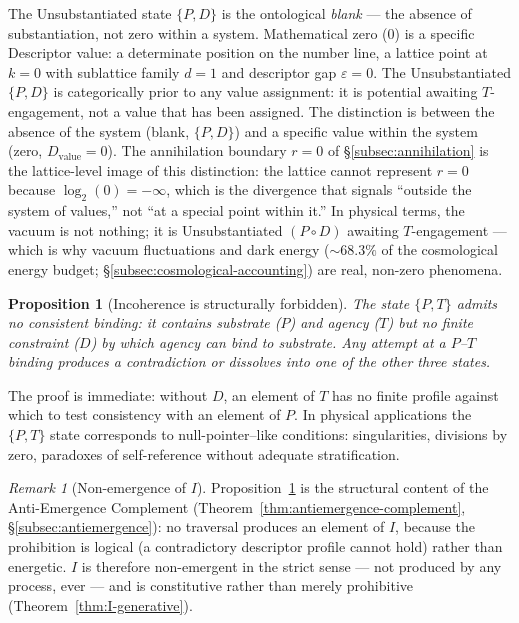 \documentclass[11pt,a4paper]{article}
\newtheorem{proposition}[theorem]{Proposition}
\theoremstyle{definition}
\theoremstyle{remark}
\newtheorem{remark}[theorem]{Remark}
\begin{document}
The Unsubstantiated state $\{P,D\}$ is the ontological \emph{blank} --- the absence of substantiation, not zero within a system. Mathematical zero ($0$) is a specific Descriptor value: a determinate position on the number line, a lattice point at $k = 0$ with sublattice family $d = 1$ and descriptor gap $\varepsilon = 0$. The Unsubstantiated $\{P,D\}$ is categorically prior to any value assignment: it is potential awaiting $T$-engagement, not a value that has been assigned. The distinction is between the absence of the system (blank, $\{P,D\}$) and a specific value within the system (zero, $D_{\mathrm{value}} = 0$). The annihilation boundary $r = 0$ of \S\ref{subsec:annihilation} is the lattice-level image of this distinction: the lattice cannot represent $r = 0$ because $\log_{2}(0) = -\infty$, which is the divergence that signals ``outside the system of values,'' not ``at a special point within it.'' In physical terms, the vacuum is not nothing; it is Unsubstantiated $(P \circ D)$ awaiting $T$-engagement --- which is why vacuum fluctuations and dark energy ($\sim 68.3\%$ of the cosmological energy budget; \S\ref{subsec:cosmological-accounting}) are real, non-zero phenomena.

\begin{proposition}[Incoherence is structurally forbidden]\label{prop:incoherence}
The state $\{P,T\}$ admits no consistent binding: it contains substrate ($P$) and agency ($T$) but no finite constraint ($D$) by which agency can bind to substrate. Any attempt at a $P$--$T$ binding produces a contradiction or dissolves into one of the other three states.
\end{proposition}

The proof is immediate: without $D$, an element of $T$ has no finite profile against which to test consistency with an element of $P$. In physical applications the $\{P,T\}$ state corresponds to null-pointer--like conditions: singularities, divisions by zero, paradoxes of self-reference without adequate stratification.

\begin{remark}[Non-emergence of $I$]\label{rem:I-nonemergent}
Proposition~\ref{prop:incoherence} is the structural content of the Anti-Emergence Complement (Theorem~\ref{thm:antiemergence-complement}, \S\ref{subsec:antiemergence}): no traversal produces an element of $I$, because the prohibition is logical (a contradictory descriptor profile cannot hold) rather than energetic. $I$ is therefore non-emergent in the strict sense --- not produced by any process, ever --- and is constitutive rather than merely prohibitive (Theorem~\ref{thm:I-generative}).
\end{remark}
\end{document}
